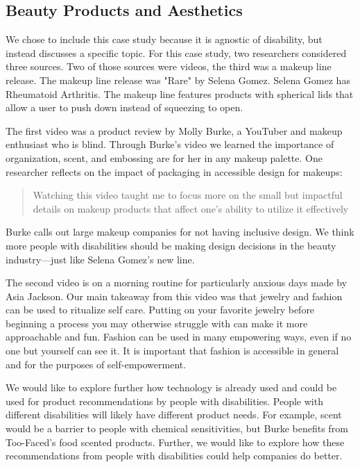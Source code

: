 \subsection{Beauty Products and Aesthetics}
We chose to include this case study because it is agnostic of disability, but instead discusses a specific topic. For this case study, two researchers considered three sources. Two of those sources were videos, the third was a makeup line release. The makeup line release was "Rare" by Selena Gomez. Selena Gomez has Rheumatoid Arthritis. The makeup line features products with spherical lids that allow a user to push down instead of squeezing to open. 

The first video was a product review by Molly Burke, a YouTuber and makeup enthusiast who is blind. Through Burke's video we learned the importance of organization, scent, and embossing are for her in any makeup palette. One researcher reflects on the impact of packaging in accessible design for makeups:
\begin{quote}
    Watching this video taught me to focus more on the small but impactful details on makeup products that affect one’s ability to utilize it effectively
\end{quote}

Burke calls out large makeup companies for not having inclusive design. We think more people with disabilities should be making design decisions in the beauty industry—just like Selena Gomez's new line. 

The second video is on a morning routine for particularly anxious days made by Asia Jackson. Our main takeaway from this video was that jewelry and fashion can be used to ritualize self care. Putting on your favorite jewelry before beginning a process you may otherwise struggle with can make it more approachable and fun. Fashion can be used in many empowering ways, even if no one but yourself can see it. It is important that fashion is accessible in general and for the purposes of self-empowerment.

We would like to explore further how technology is already used and could be used for product recommendations by people with disabilities. People with different disabilities will likely have different product needs. For example, scent would be a barrier to people with chemical sensitivities, but Burke benefits from Too-Faced's food scented products. Further, we would like to explore how these recommendations from people with disabilities could help companies do better. 

